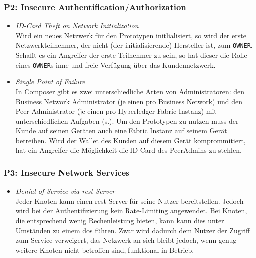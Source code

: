         \subsubsection*{P2: Insecure Authentification/Authorization}
            \begin{itemize}[leftmargin=0cm,label={}]
    	        \item \emph{ID-Card Theft on Network Initialization}\label{vuln:prototype_id_theft}\\
    	            Wird ein neues Netzwerk für den Prototypen initlialisiert, so wird der erste Netzwerkteilnehmer, der nicht (der initialisierende) Hersteller ist, zum \colorbox{light-gray}{\lstinline{OWNER}}. 
    	            Schafft es ein Angreifer der erste Teilnehmer zu sein, so hat dieser die Rolle eines \colorbox{light-gray}{\lstinline{OWNER}}s inne und freie Verfügung über das Kundennetzwerk.
    	        \item \emph{Single Point of Failure}\label{vuln:prototype_spf}\\
                    In Composer gibt es zwei unterschiedliche Arten von Administratoren: den Business Network Administrator (je einen pro Business Network) und den Peer Administrator (je einen pro Hyperledger Fabric Instanz) mit unterschiedlichen Aufgaben (s.). 
                    Um den Prototypen zu nutzen muss der Kunde auf seinen Geräten auch eine Fabric Instanz auf seinem Gerät betreiben. 
                    Wird der Wallet des Kunden auf diesem Gerät komprommitiert, hat ein Angreifer die Möglichkeit die ID-Card des PeerAdmins zu stehlen. 
            \end{itemize}
            
        \subsubsection*{P3: Insecure Network Services}
            \begin{itemize}[leftmargin=0cm,label={}]
                \item \emph{Denial of Service via \gls{rest}-Server}\label{vuln:prototype_dos}\\
        	        Jeder Knoten kann einen \gls{rest}-Server für seine Nutzer bereitstellen. 
        	        Jedoch wird bei der Authentifizierung kein Rate-Limiting angewendet. 
        	        Bei Knoten, die entsprechend wenig Rechenleistung bieten, kann kann dies unter Umständen zu einem \gls{dos} führen. 
        	        Zwar wird dadurch dem Nutzer der Zugriff zum Service verweigert, das Netzwerk an sich bleibt jedoch, wenn genug weitere Knoten nicht betroffen sind, funktional in Betrieb.
            \end{itemize}
            
